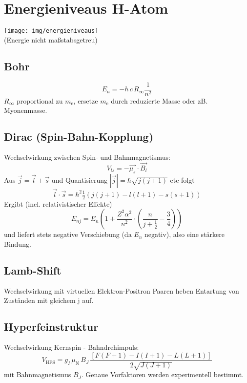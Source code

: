 \section{Energieniveaus H-Atom}
\begin{center}
	\texttt{[image: img/energieniveaus]}\\
	(Energie nicht maßstabsgetreu)
\end{center}

\subsection{Bohr}
\begin{equation*}
	E_n = -h \, c \, R_\infty \frac{1}{n^2}
\end{equation*}
$R_\infty$ proportional zu $m_\text{e}$, ersetze $m_\text{e}$ durch reduzierte Masse oder zB. Myonenmasse.

\subsection{Dirac (Spin-Bahn-Kopplung)}
Wechselwirkung zwischen Spin- und Bahnmagnetismus:
\begin{equation*}
	V_{ls} = -\vec{\mu_s} \cdot \vec{B_l}
\end{equation*}
Aus $\vec{j} = \vec{l} + \vec{s}$ und Quantisierung $|\vec{j}| = \hbar \sqrt{j(j+1)}$ etc folgt
\begin{equation*}
	\vec{l} \cdot \vec{s} = \hbar^2 \tfrac{1}{2}\left(j(j+1)-l(l+1)-s(s+1)\right)
\end{equation*}
Ergibt (incl. relativistischer Effekte)
\begin{equation*}
	E_{nj} = E_n \left(1 + \frac{Z^2 \alpha^2}{n^2} \cdot \left(\frac{n}{j+\frac{1}{2}} - \frac{3}{4} \right)\right)
\end{equation*}
und liefert stets negative Verschiebung (da $E_n$ negativ), also eine stärkere Bindung.

\subsection{Lamb-Shift}
Wechselwirkung mit virtuellen Elektron-Positron Paaren heben Entartung von Zuständen mit gleichem j auf.

\subsection{Hyperfeinstruktur}
Wechselwirkung Kernspin - Bahndrehimpuls:
\begin{equation*}
	V_\text{HFS} = g_I \, \mu_\text{N} \, B_J \, \frac{\left[F(F+1)-I(I+1)-L(L+1)\right]}{2 \sqrt{J(J+1)}}
\end{equation*}
mit Bahnmagnetismus $B_J$.
Genaue Vorfaktoren werden experimentell bestimmt.

